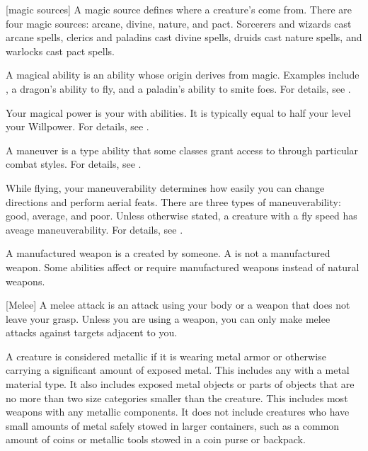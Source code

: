 [magic sources] A magic source defines where a creature's  come from.
There are four magic sources: arcane, divine, nature, and pact.
Sorcerers and wizards cast arcane spells, clerics and paladins cast divine spells, druids cast nature spells, and warlocks cast pact spells.

 A magical ability is an ability whose origin derives from magic.
Examples include , a dragon's ability to fly, and a paladin's ability to smite foes.
For details, see .

 Your magical power is your  with \magical abilities.
It is typically equal to half your level \add your Willpower.
For details, see .

 A maneuver is a type  ability that some classes grant access to through particular combat styles.
For details, see .

 While flying, your maneuverability determines how easily you can change directions and perform aerial feats.
There are three types of maneuverability: good, average, and poor.
Unless otherwise stated, a creature with a fly speed has aveage maneuverability.
For details, see .

 A manufactured weapon is a  created by someone.
A  is not a manufactured weapon. 
Some abilities affect or require manufactured weapons instead of natural weapons.

[Melee] A melee attack is an attack using your body or a weapon that does not leave your grasp.
Unless you are using a  weapon, you can only make melee attacks against targets adjacent to you.

 A creature is considered metallic if it is wearing metal armor or otherwise carrying a significant amount of exposed metal.
This includes any  with a metal material type.
It also includes exposed metal objects or parts of objects that are no more than two size categories smaller than the creature.
This includes most weapons with any metallic components.
It does not include creatures who have small amounts of metal safely stowed in larger containers, such as a common amount of coins or metallic tools stowed in a coin purse or backpack.

